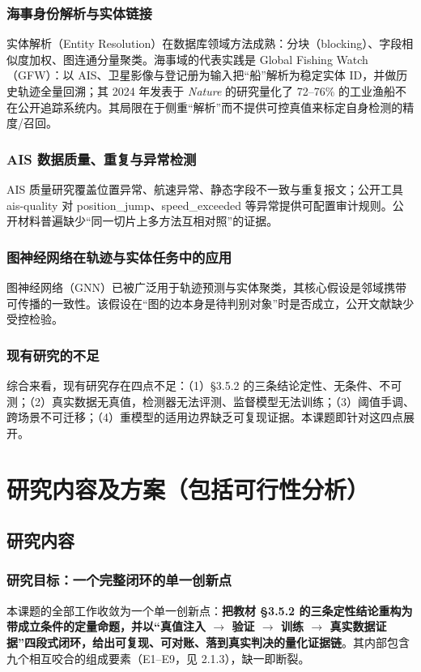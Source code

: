 \documentclass[10.5pt,a4paper]{ctexart}
\begin{document}
\subsubsection{海事身份解析与实体链接}
实体解析（Entity Resolution）在数据库领域方法成熟：分块（blocking）、字段相似度加权、图连通分量聚类。海事域的代表实践是 Global Fishing Watch（GFW）：以 AIS、卫星影像与登记册为输入把``船''解析为稳定实体 ID，并做历史轨迹全量回溯；其 2024 年发表于 \emph{Nature} 的研究量化了 72--76\% 的工业渔船不在公开追踪系统内\cite{gfw2024}。其局限在于侧重``解析''而不提供可控真值来标定自身检测的精度/召回。

\subsubsection{AIS 数据质量、重复与异常检测}
AIS 质量研究覆盖位置异常、航速异常、静态字段不一致与重复报文；公开工具 ais-quality 对 position\_jump、speed\_exceeded 等异常提供可配置审计规则\cite{aisquality}。公开材料普遍缺少``同一切片上多方法互相对照''的证据。

\subsubsection{图神经网络在轨迹与实体任务中的应用}
图神经网络（GNN）已被广泛用于轨迹预测与实体聚类，其核心假设是邻域携带可传播的一致性。该假设在``图的边本身是待判别对象''时是否成立，公开文献缺少受控检验。

\subsubsection{现有研究的不足}
综合来看，现有研究存在四点不足：（1）\S3.5.2 的三条结论定性、无条件、不可测；（2）真实数据无真值，检测器无法评测、监督模型无法训练；（3）阈值手调、跨场景不可迁移；（4）重模型的适用边界缺乏可复现证据。本课题即针对这四点展开。

\section{研究内容及方案（包括可行性分析）}
\subsection{研究内容}
\subsubsection{研究目标：一个完整闭环的单一创新点}
本课题的全部工作收敛为一个单一创新点：\textbf{把教材 \S3.5.2 的三条定性结论重构为带成立条件的定量命题，并以``真值注入 $\rightarrow$ 验证 $\rightarrow$ 训练 $\rightarrow$ 真实数据证据''四段式闭环，给出可复现、可对账、落到真实判决的量化证据链}。其内部包含九个相互咬合的组成要素（E1--E9，见 2.1.3），缺一即断裂。
\end{document}
